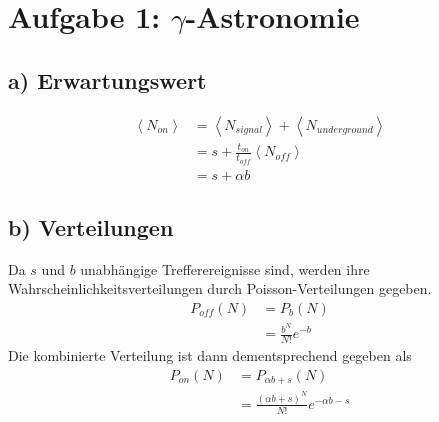 \section*{Aufgabe 1: $\gamma$-Astronomie}
\label{sec:Aufgabe1}
\subsection*{a) Erwartungswert}
\label{sub:Erwartungswert}
\begin{align}
    \left<N_{on}\right> &=\left<N_{signal}\right>+\left<N_{underground}\right>\nonumber\\
                        &=s + \frac{t_{on}}{t_{off}} \left<N_{off}\right>\nonumber\\
                        &=s+\alpha b
\end{align}

\subsection*{b) Verteilungen}
\label{sub:Verteilungen}
Da $s$ und $b$ unabhängige Trefferereignisse sind, werden ihre Wahrscheinlichkeitsverteilungen durch Poisson-Verteilungen gegeben.
\begin{align}
    P_{off}(N)&=P_{b}(N)\nonumber\\
              &=\frac{b^N}{N!}e^{-b}
\end{align}
Die kombinierte Verteilung ist dann dementsprechend gegeben als
\begin{align}
    P_{on}(N)&=P_{\alpha b+s}(N)\nonumber\\
                       &=\frac{(\alpha b+s)^N}{N!}e^{-\alpha b-s}
\end{align}

